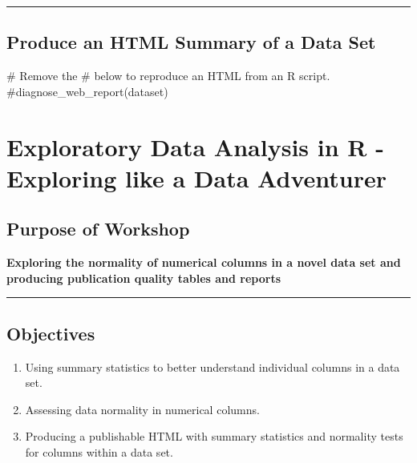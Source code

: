 \documentclass[
  letterpaper,
  DIV=11,
  numbers=noendperiod]{scrreprt}
\newenvironment{Shaded}{\begin{snugshade}}{\end{snugshade}}
\newcommand{\CommentTok}[1]{\textcolor[rgb]{0.37,0.37,0.37}{#1}}
\providecommand{\tightlist}{%
  \setlength{\itemsep}{0pt}\setlength{\parskip}{0pt}}\usepackage{longtable,booktabs,array}
\begin{document}
\begin{center}\rule{0.5\linewidth}{0.5pt}\end{center}

\hypertarget{produce-an-html-summary-of-a-data-set}{%
\section{Produce an HTML Summary of a Data
Set}\label{produce-an-html-summary-of-a-data-set}}

\begin{Shaded}
\begin{Highlighting}[]
\CommentTok{\# Remove the \textquotesingle{}\#\textquotesingle{} below to reproduce an HTML from an R script. }
\CommentTok{\#diagnose\_web\_report(dataset)}
\end{Highlighting}
\end{Shaded}


\hypertarget{exploratory-data-analysis-in-r---exploring-like-a-data-adventurer-1}{%
\chapter{Exploratory Data Analysis in R - Exploring like a Data
Adventurer}\label{exploratory-data-analysis-in-r---exploring-like-a-data-adventurer-1}}

\hypertarget{purpose-of-workshop-2}{%
\section{Purpose of Workshop}\label{purpose-of-workshop-2}}

\textbf{Exploring the normality of numerical columns in a novel data set
and producing publication quality tables and reports}

\begin{center}\rule{0.5\linewidth}{0.5pt}\end{center}

\hypertarget{objectives-1}{%
\section{Objectives}\label{objectives-1}}

\begin{enumerate}
\def\labelenumi{\arabic{enumi}.}
\tightlist
\item
  Using summary statistics to better understand individual columns in a
  data set.
\item
  Assessing data normality in numerical columns.
\item
  Producing a publishable HTML with summary statistics and normality
  tests for columns within a data set.
\end{enumerate}
\end{document}
